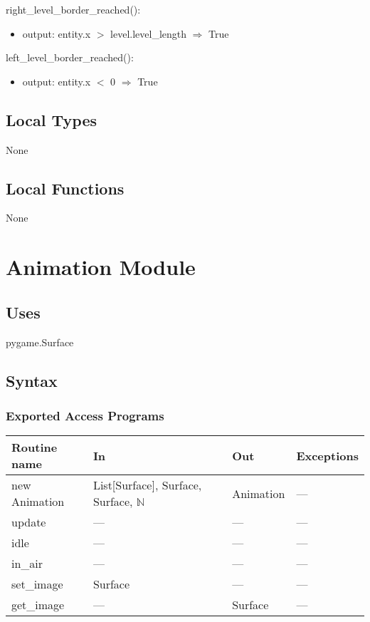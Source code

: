 \documentclass[12pt]{article}
\begin{document}
right\_level\_border\_reached():
\begin{itemize}
    \item output: entity.x $>$ level.level\_length $\Rightarrow$ True
\end{itemize}

left\_level\_border\_reached():
\begin{itemize}
    \item output: entity.x $<$ 0 $\Rightarrow$ True
\end{itemize}

\subsection* {Local Types}

None

\subsection* {Local Functions}

None
\newpage

\section* {Animation Module}

\subsection* {Uses}
pygame.Surface
\subsection* {Syntax}

\subsubsection* {Exported Access Programs}

\begin{tabular}{| l | l | l | l |}
\hline
\textbf{Routine name} & \textbf{In} & \textbf{Out} & \textbf{Exceptions}\\
\hline
new Animation & List[Surface], Surface, Surface, $\mathbb{N}$ & Animation & ---\\
\hline
update & --- & --- & ---\\
\hline
idle & --- & --- & ---\\
\hline
in\_air & --- & --- & ---\\
\hline
\color{red}set\_image & \color{red}Surface & \color{red}--- & \color{red}---\\
\hline
\color{red}get\_image & \color{red}--- & \color{red}Surface & \color{red}---\\
\hline
\end{tabular}
\end{document}

